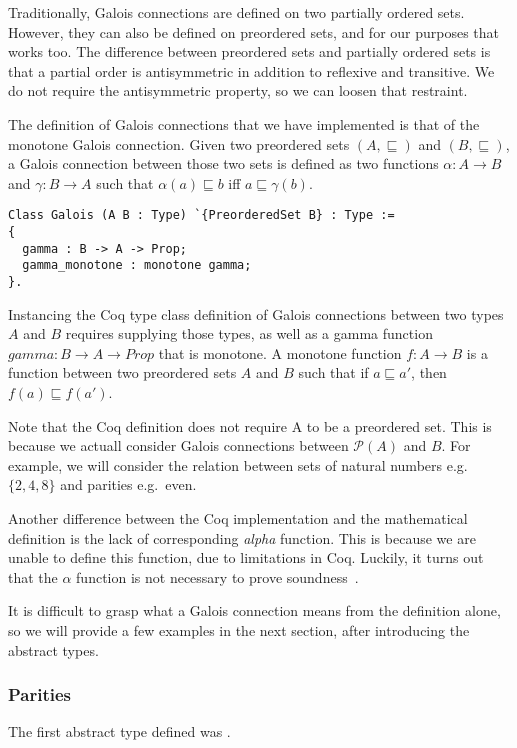 Traditionally, Galois connections are defined on two partially ordered sets.
However, they can also be defined on preordered sets, and for our purposes that
works too. %
The difference between preordered sets and partially ordered sets is
that a partial order is antisymmetric in addition to reflexive and transitive.
We do not require the antisymmetric property, so we can loosen that restraint.

The definition of Galois connections that we have implemented is that of the
monotone Galois connection. Given two preordered sets $(A,\sqsubseteq)$ and
$(B,\sqsubseteq)$, a Galois connection between those two sets is defined as two
functions $\alpha : A \rightarrow B$ and $\gamma : B \rightarrow A$ such 
that $\alpha(a)
\sqsubseteq b$ iff $a \sqsubseteq \gamma(b)$.

\begin{verbatim}
Class Galois (A B : Type) `{PreorderedSet B} : Type :=
{
  gamma : B -> A -> Prop;
  gamma_monotone : monotone gamma;
}.
\end{verbatim}

Instancing the Coq type class definition of Galois connections between two
types $A$ and $B$ requires supplying those types, as well as a gamma function
$gamma : B \rightarrow A \rightarrow Prop$ that is monotone. 
A monotone function $f : A \rightarrow B$ is
a function between two preordered sets $A$ and $B$ such that if $a \sqsubseteq
a'$, then $f(a) \sqsubseteq f(a')$.

Note that the Coq definition does not require A to be a preordered set. This is
because we actuall consider Galois connections between $\mathcal{P}(A)$ and
$B$. For example, we will consider the relation between sets of natural numbers
e.g.\ $\{2, 4, 8\}$ and parities e.g.\ even.

Another difference between the Coq implementation and the mathematical
definition is the lack of corresponding \textit{alpha} function. This is
because we are unable to define this function, due to limitations in Coq.
Luckily, it turns out that the $\alpha$ function is not necessary to prove
soundness~\cite{jourdan2016verasco}.

It is difficult to grasp what a Galois connection means from the definition
alone, so we will provide a few examples in the next section, after
introducing the abstract types.

\subsubsection{Parities}
The first abstract type defined was .

